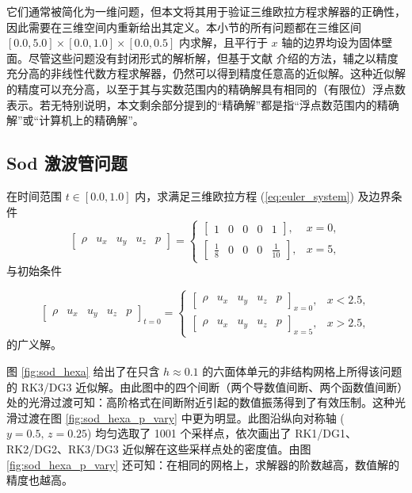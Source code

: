 它们通常被简化为一维问题，但本文将其用于验证三维欧拉方程求解器的正确性，因此需要在三维空间内重新给出其定义。本小节的所有问题都在三维区间
$[0.0,5.0]\times[0.0,1.0]\times[0.0,0.5]$ 内求解，且平行于 $x$ 轴的边界均设为固体壁面。尽管这些问题没有封闭形式的解析解，但基于文献 \cite{Toro_2009}
介绍的方法，辅之以精度充分高的非线性代数方程求解器，仍然可以得到精度任意高的近似解。这种近似解的精度可以充分高，以至于其与实数范围内的精确解具有相同的（有限位）浮点数表示。若无特别说明，本文剩余部分提到的“精确解”都是指“浮点数范围内的精确解”或“计算机上的精确解”。

\subsection{Sod 激波管问题}
\begin{problem}
\label{prob:Sod-=006FC0=006CE2=007BA1}在时间范围 $t\in[0.0,1.0]$
内，求满足三维欧拉方程 (\ref{eq:euler_system}) 及边界条件
\begin{equation}
\begin{bmatrix}\rho & u_{x} & u_{y} & u_{z} & p\end{bmatrix}=\begin{cases}
\begin{bmatrix}1 & 0 & 0 & 0 & 1\end{bmatrix}, & x=0,\\
\begin{bmatrix}\frac{1}{8} & 0 & 0 & 0 & \frac{1}{10}\end{bmatrix}, & x=5,
\end{cases}
\end{equation}
与初始条件

\begin{equation}
\begin{bmatrix}\rho & u_{x} & u_{y} & u_{z} & p\end{bmatrix}_{t=0}=\begin{cases}
\begin{bmatrix}\rho & u_{x} & u_{y} & u_{z} & p\end{bmatrix}_{x=0}, & x<2.5,\\
\begin{bmatrix}\rho & u_{x} & u_{y} & u_{z} & p\end{bmatrix}_{x=5}, & x>2.5,
\end{cases}
\end{equation}
的广义解。
\end{problem}

图 \ref{fig:sod_hexa} 给出了在只含 $h\approx0.1$ 的六面体单元的非结构网格上所得该问题的 RK3/DG3
近似解。由此图中的四个间断（两个导数值间断、两个函数值间断）处的光滑过渡可知：高阶格式在间断附近引起的数值振荡得到了有效压制。这种光滑过渡在图
\ref{fig:sod_hexa_p_vary} 中更为明显。此图沿纵向对称轴 ($y=0.5,\,z=0.25$) 均匀选取了
1001 个采样点，依次画出了 RK1/DG1、RK2/DG2、RK3/DG3 近似解在这些采样点处的密度值。由图 \ref{fig:sod_hexa_p_vary}
还可知：在相同的网格上，求解器的阶数越高，数值解的精度也越高。

